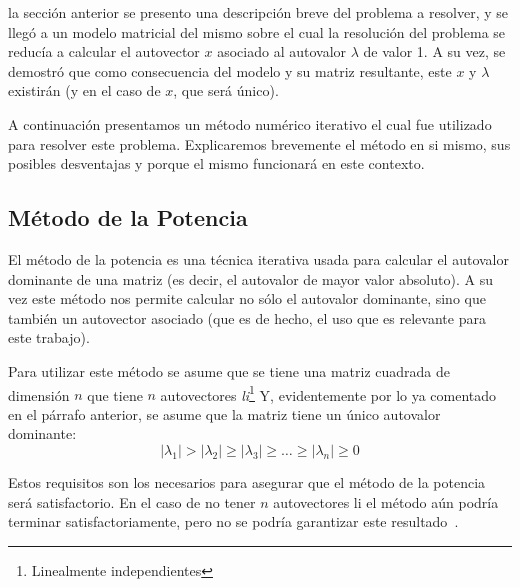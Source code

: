 \par {} la secci\'on anterior se presento una descripci\'on
breve del problema a resolver, y se lleg\'o a un modelo matricial del mismo
sobre el cual la resoluci\'on del problema se reduc\'ia a calcular el autovector
$x$ asociado al autovalor $\lambda$ de valor 1. A su vez, se demostr\'o que como
consecuencia del modelo y su matriz resultante, este $x$ y $\lambda$ existir\'an
(y en el caso de $x$, que ser\'a \'unico).

\par A continuaci\'on presentamos un m\'etodo num\'erico iterativo el cual fue
utilizado para resolver este problema. Explicaremos brevemente el m\'etodo en si
mismo, sus posibles desventajas y porque el mismo funcionar\'a en este contexto.

\subsection{M\'etodo de la Potencia}
\par El m\'etodo de la potencia es una t\'ecnica iterativa usada para calcular
el autovalor dominante de una matriz (es decir, el autovalor de mayor valor
absoluto). A su vez este m\'etodo nos permite calcular no s\'olo el autovalor
dominante, sino que tambi\'en un autovector asociado (que es de hecho, el uso que
es relevante para este trabajo).

\par Para utilizar este m\'etodo se asume que se tiene una matriz cuadrada de
dimensi\'on $n$ que tiene $n$ autovectores \emph{li}\footnote{Linealmente
independientes} Y, evidentemente por lo ya comentado en el p\'arrafo anterior,
se asume que la matriz tiene un \'unico autovalor dominante:
\begin{equation*}
    |\lambda_1|>|\lambda_2|\geq|\lambda_3|\geq\dots\geq|\lambda_n|\geq 0
\end{equation*}

\par Estos requisitos son los necesarios para asegurar que el m\'etodo de la
potencia ser\'a satisfactorio. En el caso de no tener $n$ autovectores li el
m\'etodo a\'un podr\'ia terminar satisfactoriamente, pero no se podr\'ia
garantizar este resultado~\cite[p.576]{Burden2010}.

